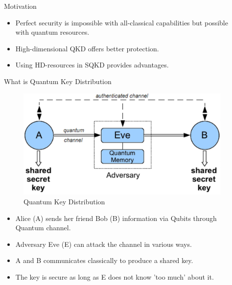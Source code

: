 \documentclass[final]{beamer}
\newlength{\sepwid}
\newlength{\onecolwid}
\begin{document}
\begin{frame}[t]
\begin{columns}[t]
\begin{column}{\onecolwid}
\begin{block}{Motivation}
\begin{itemize}
\item Perfect security is impossible with all-classical capabilities but possible with quantum resources. 
\item High-dimensional QKD offers better protection.
\item Using HD-resources in SQKD provides advantages. 
\end{itemize}

\end{block}


\begin{block}{What is Quantum Key Distribution}
	
	\begin{figure}
		\includegraphics[width=\linewidth]{qkd.png}
		\caption{Quantum Key Distribution}
	\end{figure}
\begin{itemize}
\item Alice (A) sends her friend Bob (B) information via Qubits through Quantum channel.
\item Adversary Eve (E) can attack the channel in various ways.
\item A and B communicates classically to produce a shared key.
\item The key is secure as long as E does not know 'too much' about it.
\end{itemize}	
	
\end{block}


\end{column} %


\begin{column}{\sepwid}\end{column} %


\end{columns}
\end{frame}
\end{document}
